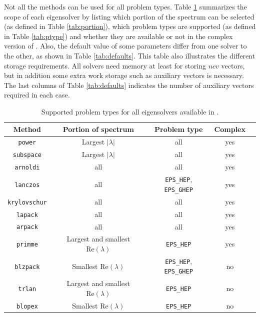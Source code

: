 	Not all the methods can be used for all problem types. Table \ref{tab:support} summarizes the scope of each eigensolver by listing which portion of the spectrum can be selected (as defined in Table \ref{tab:portion}), which problem types are supported (as defined in Table \ref{tab:ptype}) and whether they are available or not in the complex version of \slepc. Also, the default value of some parameters differ from one solver to the other, as shown in Table \ref{tab:defaults}. This table also illustrates the different storage requirements. All solvers need memory at least for storing $ncv$ vectors, but in addition some extra work storage such as auxiliary vectors is necessary. The last columns of Table \ref{tab:defaults} indicates the number of auxiliary vectors required in each case.

\begin{table}
\centering
\begin{tabular}{ccccc} \hline
Method   &  Portion of spectrum & Problem type & Complex \\ \hline
\texttt{power}    &  Largest $|\lambda|$ & all & yes \\ 
\texttt{subspace} &  Largest $|\lambda|$ & all & yes \\ 
\texttt{arnoldi}  &  all                 & all & yes \\ 
\texttt{lanczos}  &  all                 & \Verb!EPS_HEP!, \Verb!EPS_GHEP! & yes \\ 
\texttt{krylovschur} &  all              & all & yes \\ 
\hline
\texttt{lapack}   &  all                 & all & yes \\ 
\texttt{arpack}   &  all &  all & yes \\ 
\texttt{primme}   &  Largest and smallest $\mathrm{Re}(\lambda)$ & \Verb!EPS_HEP! & yes \\ 
\texttt{blzpack}  &  Smallest $\mathrm{Re}(\lambda)$ & \Verb!EPS_HEP!, \Verb!EPS_GHEP!  & no \\ 
\texttt{trlan}    &  Largest and smallest $\mathrm{Re}(\lambda)$ & \Verb!EPS_HEP! & no \\
\texttt{blopex}   &  Smallest $\mathrm{Re}(\lambda)$ & \Verb!EPS_HEP! & no \\ \hline
\end{tabular}
\caption{\label{tab:support}Supported problem types for all eigensolvers available in \slepc.}
\end{table}

